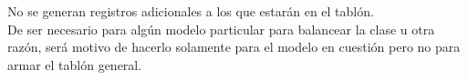 No se generan registros adicionales a los que estarán en el tablón.\\
De ser necesario para algún modelo particular para balancear la clase u otra razón, será motivo de hacerlo solamente para el modelo en cuestión pero no para armar el tablón general.